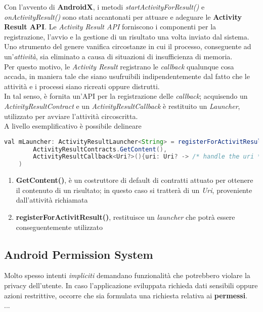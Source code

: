 \documentclass{article}
\begin{document}
Con l'avvento di \textbf{AndroidX}, i metodi \textit{startActivityForResult()} e \textit{onActivityResult()} sono stati accantonati per attuare e adeguare le \textbf{Activity Result API}. Le \textit{Activity Result API} forniscono i componenti per la registrazione, l'avvio e la gestione di un risultato una volta inviato dal sistema. Uno strumento del genere vanifica circostanze in cui il processo, conseguente ad un'\textit{attività}, sia eliminato a causa di situazioni di insufficienza di memoria.\vspace*{7pt}\\
Per questo motivo, le \textit{Activity Result} registrano le \textit{callback} qualunque cosa accada, in maniera tale che siano usufruibili indipendentemente dal fatto che le attività e i processi siano ricreati oppure distrutti.\vspace*{7pt}\\
In tal senso, è fornita un'API per la registrazione delle \textit{callback}; acquisendo un \textit{ActivityResultContract} e un \textit{ActivityResultCallback} è restituito un \textit{Launcher}, utilizzato per avviare l'attività circoscritta.\vspace*{7pt}\\
A livello esemplificativo è possibile delineare
\begin{lstlisting}[language=JAVA, title=Istanza di un launcher per le activities]
val mLauncher: ActivityResultLauncher<String> = registerForActivitResult(
        ActivityResultContracts.GetContent(),
        ActivityResultCallback<Uri?>(){uri: Uri? -> /* handle the uri */}
    )
\end{lstlisting}
\begin{enumerate}
    \itemsep0em
    \renewcommand{\labelenumi}{ } 
    \item \textbf{GetContent()}, è un costruttore di default di contratti attuato per ottenere il contenuto di un risultato; in questo caso si tratterà di un \textit{Uri}, proveniente dall'attività richiamata
    \item \textbf{registerForActivitResult()}, restituisce un \textit{launcher} che potrà essere conseguentemente utilizzato
\end{enumerate}

\subsection*{Android Permission System}
Molto spesso intenti \textit{impliciti} demandano funzionalità che potrebbero violare la privacy dell'utente. In caso l'applicazione sviluppata richieda dati sensibili oppure azioni restrittive, occorre che sia formulata una richiesta relativa ai \textbf{permessi}.\vspace*{7pt}\\
... 
\end{document}
